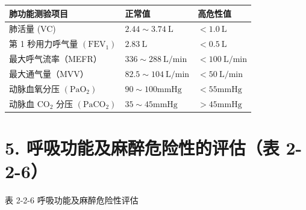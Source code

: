 \documentclass[10pt]{article}
\begin{document}
\begin{center}
\begin{tabular}{lll}
\hline
肺功能测验项目 & 正常值 & 高危性值 \\
\hline
肺活量 (VC) & $2.44 \sim 3.74 \mathrm{~L}$ & $<1.0 \mathrm{~L}$ \\
第 1 秒用力呼气量 $\left(\mathrm{FEV}_{1}\right)$ & $2.83 \mathrm{~L}$ & $<0.5 \mathrm{~L}$ \\
最大呼气流率（MEFR） & $336 \sim 288 \mathrm{~L} / \mathrm{min}$ & $<100 \mathrm{~L} / \mathrm{min}$ \\
最大通气量（MVV） & $82.5 \sim 104 \mathrm{~L} / \mathrm{min}$ & $<50 \mathrm{~L} / \mathrm{min}$ \\
动脉血氧分压 $\left(\mathrm{PaO}_{2}\right)$ & $90 \sim 100 \mathrm{mmHg}$ & $<55 \mathrm{mmHg}$ \\
动脉血 $\mathrm{CO}_{2}$ 分压 $\left(\mathrm{PaCO}_{2}\right)$ & $35 \sim 45 \mathrm{mmHg}$ & $>45 \mathrm{mmHg}$ \\
\hline
\end{tabular}
\end{center}

\section*{5. 呼吸功能及麻醉危险性的评估（表 2-2-6）}
表 2-2-6 呼吸功能及麻醉危险性评估
\end{document}
